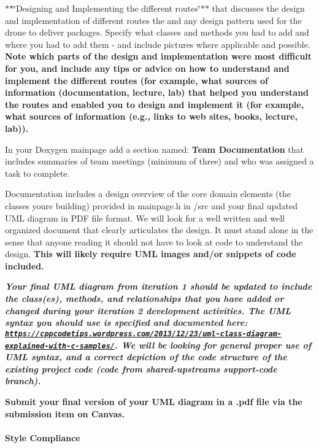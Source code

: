$\ast$$\ast$\char`\"{}\+Designing and Implementing the different routes\char`\"{}$\ast$$\ast$ that discusses the design and implementation of different routes the and any design pattern used for the drone to deliver packages. Specify what classes and methods you had to add and where you had to add them -\/ and include pictures where applicable and possible. {\bfseries Note which parts of the design and implementation were most difficult for you, and include any tips or advice on how to understand and implement the different routes (for example, what sources of information (documentation, lecture, lab) that helped you understand the routes and enabled you to design and implement it (for example, what sources of information (e.\+g., links to web sites, books, lecture, lab)).}

In your Doxygen mainpage add a section named\+: {\bfseries Team Documentation} that includes summaries of team meetings (minimum of three) and who was assigned a task to complete.

Documentation includes a design overview of the core domain elements (the classes you\textquotesingle{}re building) provided in mainpage.\+h in /src and your final updated U\+ML diagram in P\+DF file format. We will look for a well written and well organized document that clearly articulates the design. It must stand alone in the sense that anyone reading it should not have to look at code to understand the design. {\bfseries This will likely require U\+ML images and/or snippets of code included.}

{\itshape {\bfseries Your final U\+ML diagram from iteration 1 should be updated to include the class(es), methods, and relationships that you have added or changed during your iteration 2 development activities. The U\+ML syntax you should use is specified and documented here\+: \href{https://cppcodetips.wordpress.com/2013/12/23/uml-class-diagram-explained-with-c-samples/}{\tt https\+://cppcodetips.\+wordpress.\+com/2013/12/23/uml-\/class-\/diagram-\/explained-\/with-\/c-\/samples/}. We will be looking for general proper use of U\+ML syntax, and a correct depiction of the code structure of the existing project code (code from shared-\/upstream\textquotesingle{}s support-\/code branch).}}

{\bfseries Submit your final version of your U\+ML diagram in a .pdf file via the submission item on Canvas.}

\paragraph*{Style Compliance}

